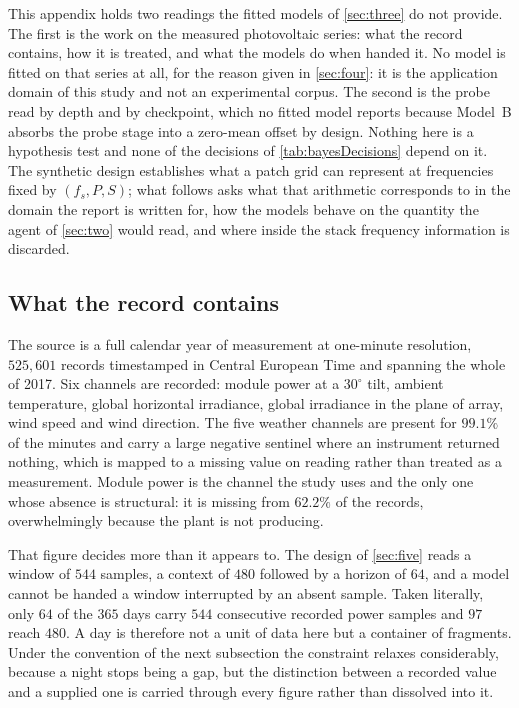 This appendix holds two readings the fitted models of \autoref{sec:three} do not provide. The first is the work on the measured photovoltaic series: what the record contains, how it is treated, and what the models do when handed it. No model is fitted on that series at all, for the reason given in \autoref{sec:four}: it is the application domain of this study and not an experimental corpus. The second is the probe read by depth and by checkpoint, which no fitted model reports because Model~B absorbs the probe stage into a zero-mean offset by design. Nothing here is a hypothesis test and none of the decisions of \autoref{tab:bayesDecisions} depend on it. The synthetic design establishes what a patch grid can represent at frequencies fixed by $(f_s,P,S)$; what follows asks what that arithmetic corresponds to in the domain the report is written for, how the models behave on the quantity the agent of \autoref{sec:two} would read, and where inside the stack frequency information is discarded.

\subsection{What the record contains}

The source is a full calendar year of measurement at one-minute resolution, $525{,}601$ records timestamped in Central European Time and spanning the whole of 2017. Six channels are recorded: module power at a $30^\circ$ tilt, ambient temperature, global horizontal irradiance, global irradiance in the plane of array, wind speed and wind direction. The five weather channels are present for $99.1\%$ of the minutes and carry a large negative sentinel where an instrument returned nothing, which is mapped to a missing value on reading rather than treated as a measurement. Module power is the channel the study uses and the only one whose absence is structural: it is missing from $62.2\%$ of the records, overwhelmingly because the plant is not producing.

That figure decides more than it appears to. The design of \autoref{sec:five} reads a window of $544$ samples, a context of $480$ followed by a horizon of $64$, and a model cannot be handed a window interrupted by an absent sample. Taken literally, only $64$ of the $365$ days carry $544$ consecutive recorded power samples and $97$ reach $480$. A day is therefore not a unit of data here but a container of fragments. Under the convention of the next subsection the constraint relaxes considerably, because a night stops being a gap, but the distinction between a recorded value and a supplied one is carried through every figure rather than dissolved into it.

